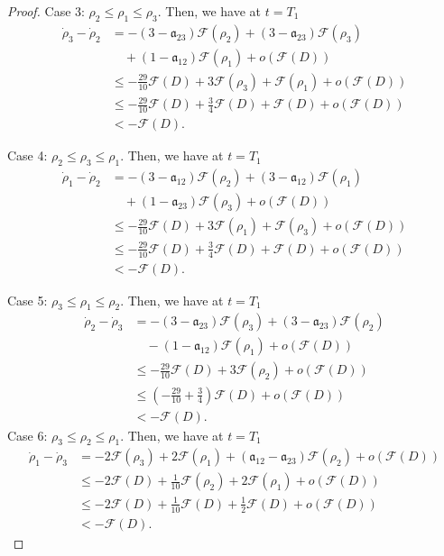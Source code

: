 \documentclass[10pt,a4paper]{amsart}
\numberwithin{equation}{section}
\begin{document}
\begin{proof}
Case 3: $\rho_2\leq \rho_1\leq \rho_3$. Then, we have at $t=T_1$
\begin{align*}
\dot{\rho}_3-\dot{\rho}_2&=-\left(3-\mathfrak{a}_{23}\right)\mathcal{F}(\rho_2)+\left(3-\mathfrak{a}_{23}\right)\mathcal{F}(\rho_3)
\\
&\quad+\left(1-\mathfrak{a}_{12}\right)\mathcal{F}(\rho_1)+o\left(\mathcal{F}(D)\right)
\\
&\leq -\frac{29}{10}\mathcal{F}(D)+3\mathcal{F}(\rho_3)+\mathcal{F}(\rho_1)+o\left(\mathcal{F}(D)\right)
\\
&\leq -\frac{29}{10}\mathcal{F}(D)+\frac{3}{4}\mathcal{F}(D)+\mathcal{F}(D)+o\left(\mathcal{F}(D)\right)
\\
&<-\mathcal{F}(D).
\end{align*}

Case 4: $\rho_2\leq \rho_3\leq \rho_1$. Then, we have at $t=T_1$
\begin{align*}
\dot{\rho}_1-\dot{\rho}_2&=-\left(3-\mathfrak{a}_{12}\right)\mathcal{F}(\rho_2)+\left(3-\mathfrak{a}_{12}\right)\mathcal{F}(\rho_1)
\\
&\quad+\left(1-\mathfrak{a}_{23}\right)\mathcal{F}(\rho_3)+o\left(\mathcal{F}(D)\right)
\\
&\leq -\frac{29}{10}\mathcal{F}(D)+3\mathcal{F}(\rho_1)+\mathcal{F}(\rho_3)+o\left(\mathcal{F}(D)\right)
\\
&\leq -\frac{29}{10}\mathcal{F}(D)+\frac{3}{4}\mathcal{F}(D)+\mathcal{F}(D)+o\left(\mathcal{F}(D)\right)
\\
&<-\mathcal{F}(D).
\end{align*}

Case 5: $\rho_3\leq \rho_1\leq \rho_2$. Then, we have at $t=T_1$
\begin{align*}
\dot{\rho}_2-\dot{\rho}_3&=-\left(3-\mathfrak{a}_{23}\right)\mathcal{F}(\rho_3)+\left(3-\mathfrak{a}_{23}\right)\mathcal{F}(\rho_2)
\\
&\quad -\left(1-\mathfrak{a}_{12}\right)\mathcal{F}(\rho_1)+o\left(\mathcal{F}(D)\right)
\\
&\leq -\frac{29}{10}\mathcal{F}(D)+3\mathcal{F}(\rho_2)+o\left(\mathcal{F}(D)\right)
\\
&\leq \left(-\frac{29}{10}+\frac{3}{4}\right)\mathcal{F}(D)+o\left(\mathcal{F}(D)\right)
\\
&<-\mathcal{F}(D).
\end{align*}
Case 6: $\rho_3\leq \rho_2\leq \rho_1$. Then, we have at $t=T_1$
\begin{align*}
\dot{\rho}_1-\dot{\rho}_3&=-2\mathcal{F}(\rho_3)+2\mathcal{F}(\rho_1)+\left(\mathfrak{a}_{12}-\mathfrak{a}_{23}\right)\mathcal{F}(\rho_2)+o\left(\mathcal{F}(D)\right)
\\
&\leq -2\mathcal{F}(D)+\frac{1}{10}\mathcal{F}(\rho_2)+2\mathcal{F}(\rho_1)+o\left(\mathcal{F}(D)\right)
\\
&\leq  -2\mathcal{F}(D)+\frac{1}{10}\mathcal{F}(D)+\frac{1}{2}\mathcal{F}(D)+o\left(\mathcal{F}(D)\right)
\\
&<-\mathcal{F}(D).
\end{align*}


\end{proof}
\end{document}
